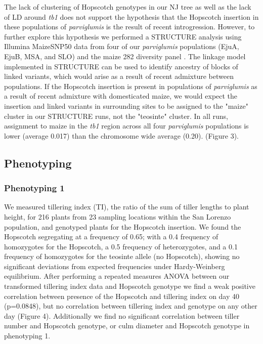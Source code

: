 \documentclass[12pt]{article}
\begin{document}
The lack of clustering of Hopscotch genotypes in our NJ tree as well as the lack of LD around \emph{tb1} does not support the hypothesis that the Hopscotch insertion in these populations of \emph{parviglumis} is the result of recent introgression. However, to further explore this hypothesis we performed a STRUCTURE analysis using Illumina MaizeSNP50 data from four of our \emph{parviglumis} populations (EjuA, EjuB, MSA, and SLO) and the maize 282 diversity panel \cite{Cook et al 2012, Phyhajarvi et al 2013}. The linkage model implemented in STRUCTURE can be used to identify ancestry of blocks of linked variants, which would arise as a result of recent admixture between populations. If the Hopscotch insertion is present in populations of \emph{parviglumis} as a result of recent admixture with domesticated maize, we would expect the insertion and linked variants in surrounding sites to be assigned to the "maize" cluster in our STRUCTURE runs, not the "teosinte" cluster. In all runs, assignment to maize in the \emph{tb1} region across all four \emph{parviglumis} populations is lower (average 0.017) than the chromosome wide average (0.20). (Figure 3). 

\subsection*{Phenotyping}

\subsubsection*{Phenotyping 1}

We measured tillering index (TI), the ratio of the sum of tiller lengths to plant height, for 216 plants from 23 sampling locations within the San Lorenzo population, and genotyped plants for the Hopscotch insertion. We found the Hopscotch segregating at a frequency of 0.65; with a 0.4 frequency of homozygotes for the Hopscotch, a 0.5 frequency of heterozygotes, and a 0.1 frequency of homozygotes for the teosinte allele (no Hopscotch), showing no significant deviations from expected frequencies under Hardy-Weinberg equilibrium. After performing a repeated measures ANOVA between our transformed tillering index data and Hopscotch genotype we find a weak positive correlation between presence of the Hopscotch and tillering index on day 40 (p=0.0848), but no correlation between tillering index and genotype on any other day (Figure 4). Additionally we find no significant correlation between tiller number and Hopscotch genotype, or culm diameter and Hopscotch genotype in phenotyping 1.
\end{document}
